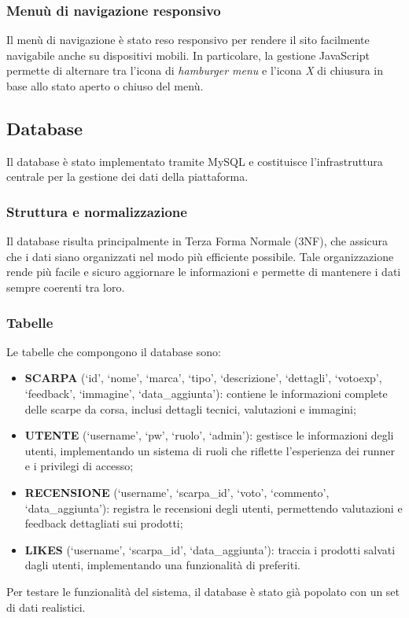 \documentclass[a4paper, 12pt]{article}
\begin{document}
\begin{justify}
\subsubsection{Menuù di navigazione responsivo}

Il menù di navigazione è stato reso responsivo per rendere il sito facilmente navigabile anche su dispositivi mobili. In particolare, la gestione JavaScript permette di alternare tra l'icona di \textit{hamburger menu} e l'icona \textit{X} di chiusura in base allo stato aperto o chiuso del menù.

\subsection{Database}

Il database è stato implementato tramite MySQL e costituisce l'infrastruttura centrale per la gestione dei dati della piattaforma.

\subsubsection{Struttura e normalizzazione}

Il database risulta principalmente in Terza Forma Normale (3NF), che assicura che i dati siano organizzati nel modo più efficiente possibile. Tale organizzazione rende più facile e sicuro aggiornare le informazioni e permette di mantenere i dati sempre coerenti tra loro.

\subsubsection{Tabelle}

Le tabelle che compongono il database sono:
\begin{itemize}
    \item \textbf{SCARPA} (`id', `nome', `marca', `tipo', `descrizione', `dettagli', `votoexp', `feedback', `immagine', `data\_aggiunta'): contiene le informazioni complete delle scarpe da corsa, inclusi dettagli tecnici, valutazioni e immagini;
    \item \textbf{UTENTE} (`username', `pw', `ruolo', `admin'): gestisce le informazioni degli utenti, implementando un sistema di ruoli che riflette l'esperienza dei runner e i privilegi di accesso;
    \item \textbf{RECENSIONE} (`username', `scarpa\_id', `voto', `commento', `data\_aggiunta'): registra le recensioni degli utenti, permettendo valutazioni e feedback dettagliati sui prodotti;
    \item \textbf{LIKES} (`username', `scarpa\_id', `data\_aggiunta'): traccia i prodotti salvati dagli utenti, implementando una funzionalità di preferiti.
\end{itemize}
Per testare le funzionalità del sistema, il database è stato già popolato con un set di dati realistici.




\end{justify}
\end{document}
